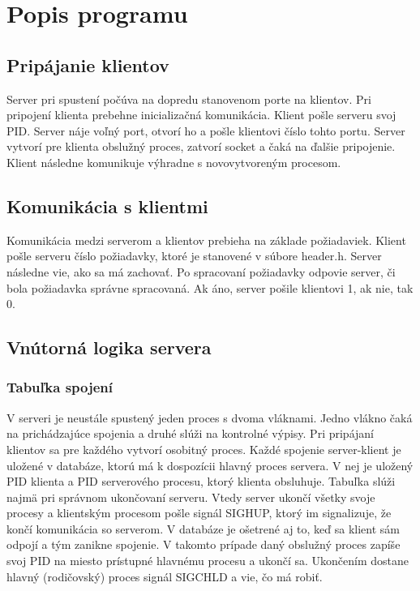 \documentclass{article}
\begin{document}
\section{Popis programu}
\subsection{Pripájanie klientov}
Server pri spustení počúva na dopredu stanovenom porte na klientov. Pri pripojení klienta prebehne
inicializačná komunikácia. Klient pošle serveru svoj PID. Server náje voľný port, otvorí ho a
pošle klientovi číslo tohto portu. Server vytvorí pre klienta obslužný proces, zatvorí socket a čaká
na ďalšie pripojenie. Klient následne komunikuje výhradne s novovytvoreným procesom.

\subsection{Komunikácia s klientmi}
Komunikácia medzi serverom a klientov prebieha na základe požiadaviek. Klient pošle serveru číslo
požiadavky, ktoré je stanovené v súbore header.h. Server následne vie, ako sa má zachovať. Po
spracovaní požiadavky odpovie server, či bola požiadavka správne spracovaná. Ak áno, server pošile
klientovi 1, ak nie, tak 0.

\subsection{Vnútorná logika servera}
\subsubsection{Tabuľka spojení}
V serveri je neustále spustený jeden proces s dvoma vláknami. Jedno vlákno čaká na prichádzajúce
spojenia a druhé slúži na kontrolné výpisy. Pri pripájaní klientov sa pre každého vytvorí osobitný
proces. 
\newline
Každé spojenie server-klient je uložené v databáze, ktorú má k dospozícii hlavný proces 
servera. V nej je uložený PID klienta a PID serverového procesu, ktorý klienta obsluhuje. Tabuľka
slúži najmä pri správnom ukončovaní serveru. Vtedy server ukončí všetky svoje procesy a klientským
procesom pošle signál SIGHUP, ktorý im signalizuje, že končí komunikácia so serverom. V databáze je
ošetrené aj to, keď sa klient sám odpojí a tým zanikne spojenie. V takomto prípade daný obslužný
proces zapíše svoj PID na miesto prístupné hlavnému procesu a ukončí sa. Ukončením dostane hlavný
(rodičovský) proces signál SIGCHLD a vie, čo má robiť.
\newline
\end{document}

